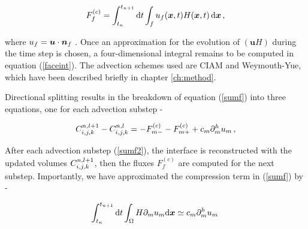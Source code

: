\begin{align}
	F_f^{(c)} = \int_{t_n}^{t_{n+1}} {\textrm {d}}t \int_{f} u_f(\boldsymbol{x},t) H(\boldsymbol{x},t) \, {\textrm{d}}\boldsymbol{x} \,,
\label{faceint}
\end{align}

where $u_f = \boldsymbol{u}\cdot \boldsymbol{n}_f$ 
.
Once an approximation for the evolution of $(\boldsymbol{u} H)$ during
the time step is chosen, a four-dimensional integral remains to be
computed in equation (\ref{faceint}).
The advection schemes used are CIAM and Weymouth-Yue, which have been 
described briefly in chapter \ref{ch:method}. 

Directional splitting results in the breakdown of equation (\ref{sumf}) 
into three equations, one for each advection substep -


\begin{align}
{C_{i,j,k}^{n,l+1} - C_{i,j,k}^{n,l}} = - F^{(c)}_{m-} - F^{(c)}_{m+} 
+ c_m \partial_{m}^h u_m \,,
\label{sumf2}
\end{align}



After each advection substep (\ref{sumf2}), the interface is reconstructed
with the updated volumes $C_{i,j,k}^{n,l+1}$, then the 
fluxes $F^{(c)}_{f}$ are computed for the next substep. 
Importantly, we have approximated the compression term in (\ref{sumf}) by -

\begin{align}
	\int_{t_n}^{t_{n+1}}  {\textrm {d}}t \int_\Omega  H \partial_m u_m  {\textrm {d}}\boldsymbol{x} \simeq  c_m 
 \partial_{m}^h u_m \, 
 \label{comp}
\end{align}


